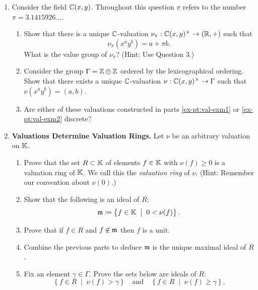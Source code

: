 \documentclass[12pt,reqno]{amsart}
\begin{document}
\begin{enumerate}[leftmargin=*]
 \item Consider the field $ \mathbb{C}(x, y)$. Throughout this question $\pi$ refers to the number $\pi=3.1415926...$.
     \begin{enumerate}[label=(\alph*),ref=\theenumi\alph*]
      \item\label{ex-pt:val-exm1} Show that there is a unique $\mathbb{C}$-valuation $\nu_{\pi}:\mathbb{C}(x,y)^{\times} \to (\mathbb{R},+)$  such that 
      \[
      \nu_{\pi}\left(x^ay^b\right) = a + \pi b.
      \]
      What is the value group of $\nu_{\pi}$? (Hint: Use Question 3.) 
      \item\label{ex-pt:val-exm2} Consider the group $\Gamma = \mathbb{Z}\oplus\mathbb{Z}$ ordered by the lexicographical ordering. Show that there exists a unique $\mathbb{C}$-valuation $\nu:\mathbb{C}(x,y)^{\times} \to \Gamma$ such that $\nu(x^ay^b)=(a,b)$. 
      \item Are either of these valuations constructed in parts \ref{ex-pt:val-exm1} or \ref{ex-pt:val-exm2} discrete?
      \end{enumerate}
        
 
 \item \textbf{Valuations Determine Valuation Rings.}  Let $\nu$ be an arbitrary valuation on $\mathbb{K}$. 
	\begin{enumerate}[label=(\alph*),ref=\theenumi\alph*]
		\item Prove that the set $R \subset \mathbb{K}$ of elements $f\in \mathbb{K}$ with $\nu(f) \geq 0$ is a valuation ring of $\mathbb{K}$. We call this the \emph{valuation ring} of $\nu$. (Hint: Remember our convention about $\nu(0)$.)
		\item Show that the following is an ideal of $R$:
		\[
		\mathfrak{m} \coloneqq \left\{ f \in \mathbb{K} \;\; \big| \;\; 0 < \nu(f) \right\}.
		\]
		\item Prove that if $f \in R$ and $f \not \in \mathfrak{m}$ then $f$ is a unit.
		\item Combine the previous parts to deduce $\mathfrak{m}$ is the unique maximal ideal of $R$. 
		\item Fix an element $\gamma \in \Gamma$. Prove the sets below are ideals of $R$:
		\[
		\left\{ f \in R \;\; \big|\;\; \nu(f) > \gamma \right\} \quad \text{and} \quad \left\{ f \in R \;\; \big|\;\; \nu(f) \geq \gamma \right\}.
		\]
	\end{enumerate}
 

\end{enumerate}
\end{document}
